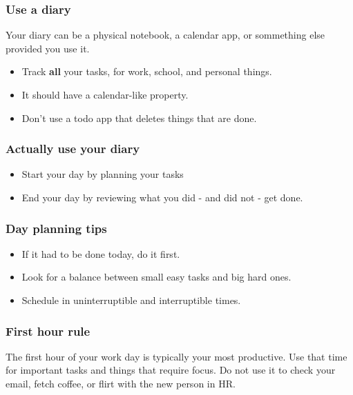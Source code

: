 \documentclass[10pt]{beamer}
\begin{document}
\begin{frame}
  \frametitle{Use a diary}

  Your diary can be a physical notebook, a calendar app, or sommething
  else provided you use it. 
  
  \begin{itemize}
    \item Track \textbf{all} your tasks, for work, school, and personal things.
    \item It should have a calendar-like property.
    \item Don't use a todo app that deletes things that are done.
  \end{itemize}
    
\end{frame}

\begin{frame}
  \frametitle{Actually use your diary}
 
   \begin{itemize}
    \item Start your day by planning your tasks
    \item End your day by reviewing what you did - and did not - get done.
  \end{itemize}
        
\end{frame}



\begin{frame}
  \frametitle{Day planning tips}

  \begin{itemize}
    \item If it had to be done today, do it first.
    \item Look for a balance between small easy tasks and big hard ones.
    \item Schedule in uninterruptible and interruptible times.
  \end{itemize}    
\end{frame}

\begin{frame}
  \frametitle{First hour rule}

  The first hour of your work day is typically your most productive. Use that time 
  for important tasks and things that require focus. Do not use it to check your email,
  fetch coffee, or flirt with the new person in HR.
      
\end{frame}
\end{document}
